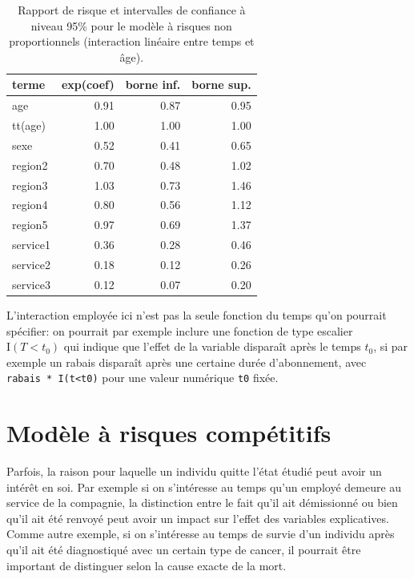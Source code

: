 \documentclass[
  11pt,
  letterpaper,
]{scrbook}
\theoremstyle{definition}
\theoremstyle{remark}
\begin{document}
\begin{longtable}[t]{lrrr}

\caption{\label{tbl-cox-np}Rapport de risque et intervalles de confiance
à niveau 95\% pour le modèle à risques non proportionnels (interaction
linéaire entre temps et âge).}

\tabularnewline

\toprule
terme & exp(coef) & borne inf. & borne sup.\\
\midrule
age & 0.91 & 0.87 & 0.95\\
tt(age) & 1.00 & 1.00 & 1.00\\
sexe & 0.52 & 0.41 & 0.65\\
region2 & 0.70 & 0.48 & 1.02\\
region3 & 1.03 & 0.73 & 1.46\\
\addlinespace
region4 & 0.80 & 0.56 & 1.12\\
region5 & 0.97 & 0.69 & 1.37\\
service1 & 0.36 & 0.28 & 0.46\\
service2 & 0.18 & 0.12 & 0.26\\
service3 & 0.12 & 0.07 & 0.20\\
\bottomrule

\end{longtable}

L'interaction employée ici n'est pas la seule fonction du temps qu'on
pourrait spécifier: on pourrait par exemple inclure une fonction de type
escalier \(\mathrm{I}(T< t_0)\) qui indique que l'effet de la variable
disparaît après le temps \(t_0\), si par exemple un rabais disparaît
après une certaine durée d'abonnement, avec
\texttt{rabais\ *\ I(t\textless{}t0)} pour une valeur numérique
\texttt{t0} fixée.

\section{Modèle à risques
compétitifs}\label{moduxe8le-uxe0-risques-compuxe9titifs}

Parfois, la raison pour laquelle un individu quitte l'état étudié peut
avoir un intérêt en soi. Par exemple si on s'intéresse au temps qu'un
employé demeure au service de la compagnie, la distinction entre le fait
qu'il ait démissionné ou bien qu'il ait été renvoyé peut avoir un impact
sur l'effet des variables explicatives. Comme autre exemple, si on
s'intéresse au temps de survie d'un individu après qu'il ait été
diagnostiqué avec un certain type de cancer, il pourrait être important
de distinguer selon la cause exacte de la mort.
\end{document}

